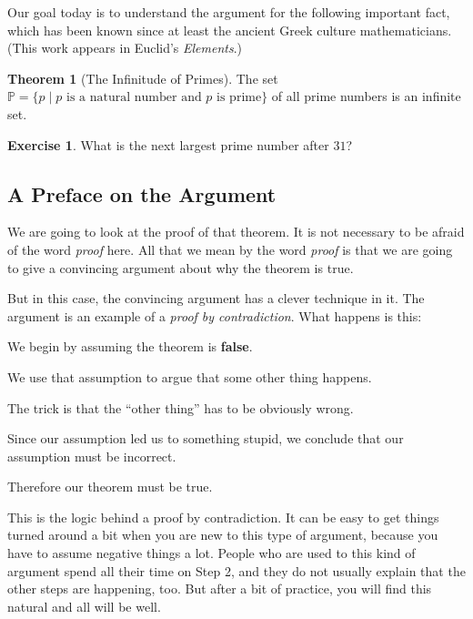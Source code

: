 \documentclass[12pt,letterpaper]{article}
\theoremstyle{definition}
\newtheorem{exercise}[question]{Exercise}
\newtheorem*{theorem}{Theorem}
\begin{document}
Our goal today is to understand the argument for the following important fact, which has been known since at least the ancient Greek culture mathematicians. 
(This work appears in Euclid's \emph{Elements}.)

\begin{theorem}[The Infinitude of Primes]
The set $\mathbb{P} = \{ p \mid \text{$p$ is a natural number and $p$ is prime} \}$ of all prime numbers is an infinite set.
\end{theorem}

\begin{exercise}
What is the next largest prime number after $31$?
\end{exercise}

\subsection*{A Preface on the Argument}

We are going to look at the proof of that theorem.
It is not necessary to be afraid of the word \emph{proof} here.
All that we mean by the word \emph{proof} is that we are going to give a convincing argument about why the theorem is true.

But in this case, the convincing argument has a clever technique in it.
The argument is an example of a \emph{proof by contradiction}. 
What happens is this:
\begin{compactdesc}
\item[Step 1:] We begin by assuming the theorem is \textbf{false}.
\item[Step 2:] We use that assumption to argue that some other thing happens.
\item[Step 3:] The trick is that the ``other thing'' has to be obviously wrong.
\item[Step 4:] Since our assumption led us to something stupid, we conclude that our assumption must be incorrect.
\item[Step 5:] Therefore our theorem must be true.
\end{compactdesc}

This is the logic behind a proof by contradiction.
It can be easy to get things turned around a bit when you are new to this type of argument, because you have to assume negative things a lot.
People who are used to this kind of argument spend all their time on Step 2, and they do not usually explain that the other steps are happening, too.
But after a bit of practice, you will find this natural and all will be well.
\end{document}
